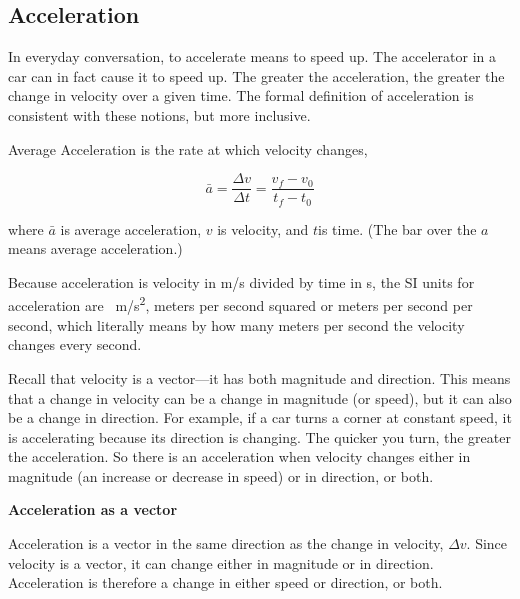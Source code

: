 \documentclass[main-ap-physics.tex]{subfiles}
\begin{document}
\subsection{Acceleration}


In everyday conversation, to accelerate means to speed up. The accelerator in a car can in fact cause it to speed up. The greater the acceleration, the greater the change in velocity over a given time. The formal definition of acceleration is consistent with these notions, but more inclusive.

\begin{mdframed}[backgroundcolor=black!10]
    Average Acceleration is the rate at which velocity changes,

    \begin{equation} \label{vdyjX5}
        \bar{a} = \frac{\Delta v}{\Delta t} = \frac{v_f - v_0}{t_f - t_0} 
    \end{equation}

    where $\bar{a}$ is average acceleration, $v$ is velocity, and $t$is time. (The bar over the $a$ means average acceleration.)
\end{mdframed}

Because acceleration is velocity in m/s divided by time in s, the SI units for acceleration are \SI{}{m/s^2}, meters per second squared or meters per second per second, which literally means by how many meters per second the velocity changes every second.

\vspace{1em}

Recall that velocity is a vector---it has both magnitude and direction. This means that a change in velocity can be a change in magnitude (or speed), but it can also be a change in direction. For example, if a car turns a corner at constant speed, it is accelerating because its direction is changing. The quicker you turn, the greater the acceleration. So there is an acceleration when velocity changes either in magnitude (an increase or decrease in speed) or in direction, or both.

\begin{mdframed}[backgroundcolor=black!10]
    \textbf{Acceleration as a vector}

    \vspace{1ex}

    Acceleration is a vector in the same direction as the change in velocity, $\Delta v$. Since velocity is a vector, it can change either in magnitude or in direction. Acceleration is therefore a change in either speed or direction, or both.
\end{mdframed}
\end{document}
